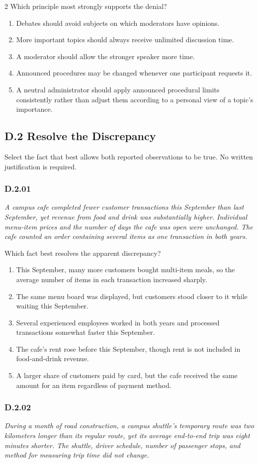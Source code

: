 \documentclass[10pt]{extarticle}
\newcommand{\choice}[1]{\item #1}
\newcommand{\bankitem}[1]{\subsubsection*{#1}}
\begin{document}
\begin{multicols}{2}
Which principle most strongly supports the denial?
\begin{enumerate}[label=(\alph*)]
  \choice{Debates should avoid subjects on which moderators have opinions.}
  \choice{More important topics should always receive unlimited discussion time.}
  \choice{A moderator should allow the stronger speaker more time.}
  \choice{Announced procedures may be changed whenever one participant requests it.}
  \choice{A neutral administrator should apply announced procedural limits consistently rather than adjust them according to a personal view of a topic's importance.}
\end{enumerate}
\subsection*{D.2 Resolve the Discrepancy}
Select the fact that best allows both reported observations to be true. No written justification is required.
\bankitem{D.2.01}
\emph{A campus cafe completed fewer customer transactions this September than last September, yet revenue from food and drink was substantially higher. Individual menu-item prices and the number of days the cafe was open were unchanged. The cafe counted an order containing several items as one transaction in both years.}

Which fact best resolves the apparent discrepancy?
\begin{enumerate}[label=(\alph*)]
  \choice{This September, many more customers bought multi-item meals, so the average number of items in each transaction increased sharply.}
  \choice{The same menu board was displayed, but customers stood closer to it while waiting this September.}
  \choice{Several experienced employees worked in both years and processed transactions somewhat faster this September.}
  \choice{The cafe's rent rose before this September, though rent is not included in food-and-drink revenue.}
  \choice{A larger share of customers paid by card, but the cafe received the same amount for an item regardless of payment method.}
\end{enumerate}
\bankitem{D.2.02}
\emph{During a month of road construction, a campus shuttle's temporary route was two kilometers longer than its regular route, yet its average end-to-end trip was eight minutes shorter. The shuttle, driver schedule, number of passenger stops, and method for measuring trip time did not change.}


\end{multicols}
\end{document}
